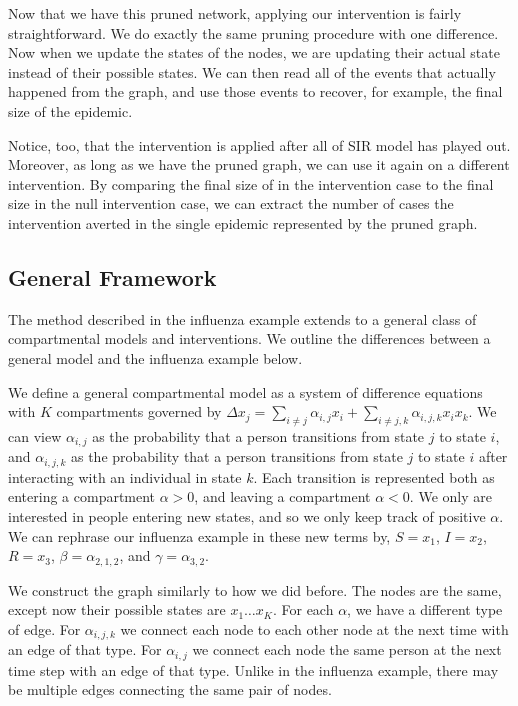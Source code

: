 \documentclass[openacc]{rsproca_new}%
\begin{document}
Now that we have this pruned network, applying our intervention is fairly straightforward.
We do exactly the same pruning procedure with one difference.
Now when we update the states of the nodes, we are updating their actual state instead of their possible states.
We can then read all of the events that actually happened from the graph, and use those events to recover, for example, the final size of the epidemic.

Notice, too, that the intervention is applied after all of SIR model has played out.
Moreover, as long as we have the pruned graph, we can use it again on a different intervention.
By comparing the final size of in the intervention case to the final size in the null intervention case, we can extract the number of cases the intervention averted in the single epidemic represented by the pruned graph.

\subsection{General Framework}

The method described in the influenza example extends to a general class of compartmental models and interventions.
We outline the differences between a general model and the influenza example below.


We define a general compartmental model as a system of difference equations with $K$ compartments governed by \(\Delta x_{j} = \sum_{i \neq j} \alpha_{i,j}x_i + \sum_{i \neq j, k} \alpha_{i,j,k} x_ix_k\).
We can view $\alpha_{i,j}$ as the probability that a person transitions from state $j$ to state $i$, and $\alpha_{i,j,k}$ as the probability that a person transitions from state $j$ to state $i$ after interacting with an individual in state $k$.
Each transition is represented both as entering a compartment $\alpha > 0$, and leaving a compartment $\alpha < 0$.
We only are interested in people entering new states, and so we only keep track of positive $\alpha$.
We can rephrase our influenza example in these new terms by, $S=x_1$, $I=x_2$, $R=x_3$, $\beta = \alpha_{2,1,2}$, and $\gamma = \alpha_{3,2}$.

We construct the graph similarly to how we did before.
The nodes are the same, except now their possible states are $x_1 \dots x_K$.
For each $\alpha$, we have a different type of edge.
For $\alpha_{i,j,k}$ we connect each node to each other node at the next time with an edge of that type.
For $\alpha_{i,j}$ we connect each node the same person at the next time step with an edge of that type.
Unlike in the influenza example, there may be multiple edges connecting the same pair of nodes.
\end{document}
